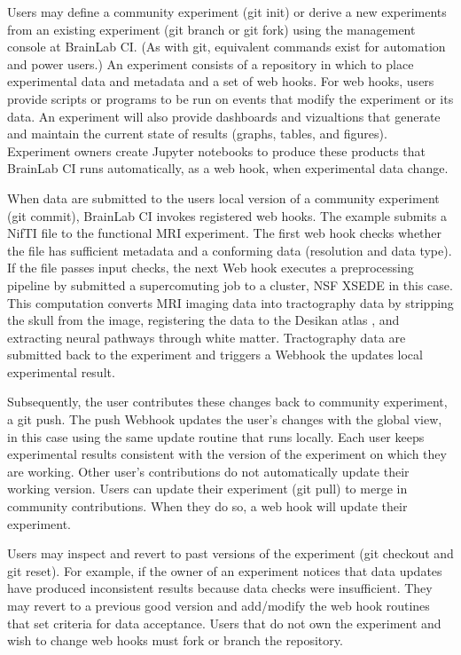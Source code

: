 Users may define a community experiment (\textsf{git init}) or derive a new experiments 
from an existing experiment (\textsf{git branch} or \textsf{git fork}) using 
the management console at BrainLab CI.  (As with git, equivalent commands exist
for automation and power users.)  An experiment consists of a repository in which to 
place experimental data and metadata and a set of web hooks. 
For web hooks, users provide scripts or programs to be run on events that modify
the experiment or its data.  An experiment will also provide dashboards and 
vizualtions that generate and maintain the current state of results 
(graphs, tables, and figures).  Experiment owners create Jupyter notebooks to produce
these products that BrainLab CI runs automatically, as a web hook, when experimental
data change.

When data are submitted to the users local version of a community 
experiment (\textsf{git commit}), BrainLab CI
invokes registered web hooks.  The example submits a NifTI file to the functional 
MRI experiment.  The first web hook checks whether the file has sufficient metadata and 
a conforming data (resolution and data type). 
If the file passes input checks, the next
Web hook executes a preprocessing pipeline by submitted a supercomuting job to a
cluster, NSF XSEDE in this case.  This computation converts MRI imaging data into 
tractography data by stripping the skull from the image, registering the data to 
the Desikan atlas \cite{Desikan2006a}, and extracting neural pathways through white matter. Tractography data
are submitted back to the experiment and triggers a Webhook the updates local 
experimental result.

Subsequently, the user contributes these changes back to community experiment,
a \textsf{git push}.  The push Webhook updates the user's changes with the global
view, in this case using the same update routine that runs locally.
Each user keeps experimental results consistent with the 
version of the experiment on which they are working.  Other user's contributions
do not automatically update their working version.  Users can update their
experiment (\textsf{git pull}) to merge in community contributions.  When 
they do so, a web hook will update their experiment.

Users may inspect and revert to past versions of the experiment
(\textsf{git checkout} and \textsf{git reset}).  For example, if the owner of
an experiment notices that data updates have produced inconsistent results
because data checks were insufficient.  They may revert to a previous good version
and add/modify the web hook routines that set criteria for data acceptance.
Users that do not own the experiment and wish to change web hooks must fork or 
branch the repository.

